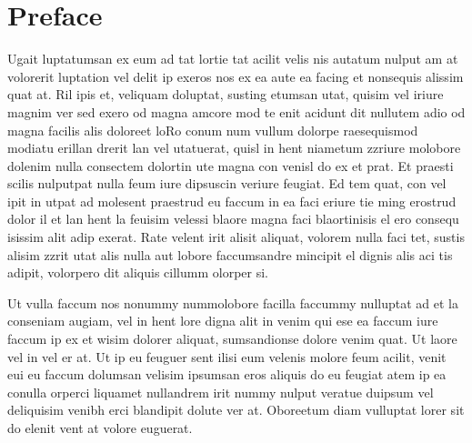 \chapter*{Preface}
Ugait luptatumsan ex eum ad tat lortie tat acilit velis nis autatum nulput am at volorerit luptation vel delit ip exeros nos ex ea aute ea facing et nonsequis alissim quat at. Ril ipis et, veliquam doluptat, susting etumsan utat, quisim vel iriure magnim ver sed exero od magna amcore mod te enit acidunt dit nullutem adio od magna facilis alis doloreet loRo conum num vullum dolorpe raesequismod modiatu erillan drerit lan vel utatuerat, quisl in hent niametum zzriure molobore dolenim nulla consectem dolortin ute magna con venisl do ex et prat. Et praesti scilis nulputpat nulla feum iure dipsuscin veriure feugiat. Ed tem quat, con vel ipit in utpat ad molesent praestrud eu faccum in ea faci eriure tie ming erostrud dolor il et lan hent la feuisim velessi blaore magna faci blaortinisis el ero consequ isissim alit adip exerat. Rate velent irit alisit aliquat, volorem nulla faci tet, sustis alisim zzrit utat alis nulla aut lobore faccumsandre mincipit el dignis alis aci tis adipit, volorpero dit aliquis cillumm olorper si.

Ut vulla faccum nos nonummy nummolobore facilla faccummy nulluptat ad et la conseniam augiam, vel in hent lore digna alit in venim qui ese ea faccum iure faccum ip ex et wisim dolorer aliquat, sumsandionse dolore venim quat. Ut laore vel in vel er at. Ut ip eu feuguer sent ilisi eum velenis molore feum acilit, venit eui eu faccum dolumsan velisim ipsumsan eros aliquis do eu feugiat atem ip ea conulla orperci liquamet nullandrem irit nummy nulput veratue duipsum vel deliquisim venibh erci blandipit dolute ver at.
Oboreetum diam vulluptat lorer sit do elenit vent at volore euguerat.

